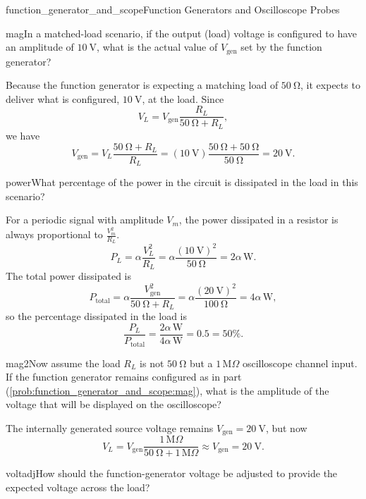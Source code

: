 \begin{mainquestion}{function_generator_and_scope}{Function Generators and Oscilloscope Probes}
\begin{partquestion}{mag}{In a matched-load scenario, if the output (load) voltage is configured to have an amplitude of $\qty{10}{\volt}$, what is the actual value of $V_\mathrm{gen}$ set by the function generator?}
\begin{answer}
Because the function generator is expecting a matching load of $\qty{50}{\ohm}$, it expects
to deliver what is configured, $\qty{10}{\volt}$, at the load. Since
\[
V_L = V_{\mathrm{gen}}\frac{R_L}{\qty{50}{\ohm} + R_L},
\]
we have
\[
V_{\mathrm{gen}}
=V_L\frac{\qty{50}{\ohm}+R_L}{R_L}
=(\qty{10}{\volt})\frac{\qty{50}{\ohm}+\qty{50}{\ohm}}{\qty{50}{\ohm}}
=\qty{20}{\volt}.
\]
\end{answer}
\end{partquestion}
\begin{partquestion}{power}{What percentage of the power in the circuit is dissipated in the load in this scenario?}
\begin{answer}
For a periodic signal with amplitude $V_m$, the power dissipated in a resistor is always proportional to $\frac{V_m^2}{R_L}$.  
\[
P_L=\alpha\frac{V_L^2}{R_L}
=\alpha\frac{(\qty{10}{\volt})^2}{\qty{50}{\ohm}}
=2\alpha\,\mathrm{W}.
\]
The total power dissipated is
\[
P_{\mathrm{total}}
=\alpha\frac{V_{\mathrm{gen}}^2}{\qty{50}{\ohm}+R_L}
=\alpha\frac{(\qty{20}{\volt})^2}{\qty{100}{\ohm}}
=4\alpha\,\mathrm{W},
\]
so the percentage dissipated in the load is
\[
\frac{P_L}{P_{\mathrm{total}}}
=\frac{2\alpha\,\mathrm{W}}{4\alpha\,\mathrm{W}}
=0.5=50\%.
\]
\end{answer}
\end{partquestion}
\begin{partquestion}{mag2}{Now assume the load $R_L$ is not $\qty{50}{\ohm}$ but a $1\,\mathrm{M}\Omega$ oscilloscope channel input. If the function generator remains configured as in part (\cref{prob:function_generator_and_scope:mag}), what is the amplitude of the voltage that will be displayed on the oscilloscope?}
\begin{answer}
The internally generated source voltage remains $V_{\mathrm{gen}}=\qty{20}{\volt}$, but now
\[
V_L
=V_{\mathrm{gen}}\frac{1\,\mathrm{M}\Omega}
{\qty{50}{\ohm}+1\,\mathrm{M}\Omega}
\approx V_{\mathrm{gen}}
=\qty{20}{\volt}.
\]
\end{answer}
\end{partquestion}
\begin{partquestion}{voltadj}{How should the function-generator voltage be adjusted to provide the expected voltage across the load?}

\end{partquestion}
\end{mainquestion}
